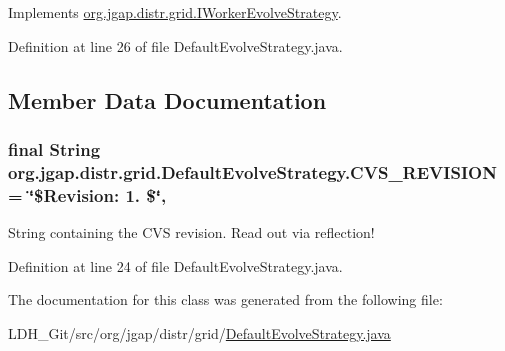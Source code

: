 Implements \hyperlink{interfaceorg_1_1jgap_1_1distr_1_1grid_1_1_i_worker_evolve_strategy_a2ce5ff7ef65b1ef408804441b505fd06}{org.\-jgap.\-distr.\-grid.\-I\-Worker\-Evolve\-Strategy}.



Definition at line 26 of file Default\-Evolve\-Strategy.\-java.



\subsection{Member Data Documentation}
\hypertarget{classorg_1_1jgap_1_1distr_1_1grid_1_1_default_evolve_strategy_a844a68d1f74050d2b905831d1cee33b1}{
\subsubsection[{C\-V\-S\-\_\-\-R\-E\-V\-I\-S\-I\-O\-N}]{\setlength{\rightskip}{0pt plus 5cm}final String org.\-jgap.\-distr.\-grid.\-Default\-Evolve\-Strategy.\-C\-V\-S\-\_\-\-R\-E\-V\-I\-S\-I\-O\-N = \char`\"{}\$Revision\-: 1. \$\char`\"{}\hspace{0.3cm}{\ttfamily [static]}, {\ttfamily [private]}}}\label{classorg_1_1jgap_1_1distr_1_1grid_1_1_default_evolve_strategy_a844a68d1f74050d2b905831d1cee33b1}
String containing the C\-V\-S revision. Read out via reflection! 

Definition at line 24 of file Default\-Evolve\-Strategy.\-java.



The documentation for this class was generated from the following file\-:\begin{DoxyCompactItemize}
\item 
L\-D\-H\-\_\-\-Git/src/org/jgap/distr/grid/\hyperlink{_default_evolve_strategy_8java}{Default\-Evolve\-Strategy.\-java}\end{DoxyCompactItemize}
